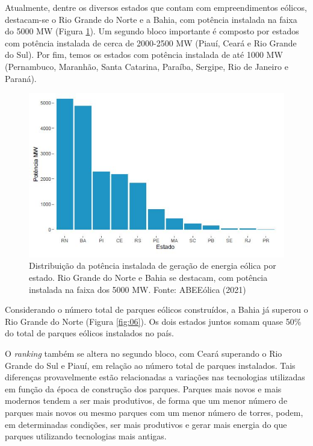 \documentclass[
  oneside]{scrbook}
\begin{document}
Atualmente, dentre os diversos estados que contam com empreendimentos eólicos, destacam-se o Rio Grande do Norte e a Bahia, com potência instalada na faixa do 5000 MW (Figura \ref{fig:05}). Um segundo bloco importante é composto por estados com potência instalada de cerca de 2000-2500 MW (Piauí, Ceará e Rio Grande do Sul). Por fim, temos os estados com potência instalada de até 1000 MW (Pernambuco, Maranhão, Santa Catarina, Paraíba, Sergipe, Rio de Janeiro e Paraná).

\begin{figure}[H]

{\centering \includegraphics[width=0.8\linewidth]{imagens/cap01/Figura_1.5} 

}

\caption{Distribuição da potência instalada de geração de energia eólica por estado. Rio Grande do Norte e Bahia se destacam, com potência instalada na faixa dos 5000 MW. Fonte: ABEEólica (2021)}\label{fig:05}
\end{figure}

Considerando o número total de parques eólicos construídos, a Bahia já superou o Rio Grande do Norte (Figura \ref{fig:06}). Os dois estados juntos somam quase 50\% do total de parques eólicos instalados no país.

O \emph{ranking} também se altera no segundo bloco, com Ceará superando o Rio Grande do Sul e Piauí, em relação ao número total de parques instalados. Tais diferenças provavelmente estão relacionadas a variações nas tecnologias utilizadas em função da época de construção dos parques. Parques mais novos e mais modernos tendem a ser mais produtivos, de forma que um menor número de parques mais novos ou mesmo parques com um menor número de torres, podem, em determinadas condições, ser mais produtivos e gerar mais energia do que parques utilizando tecnologias mais antigas.
\end{document}
